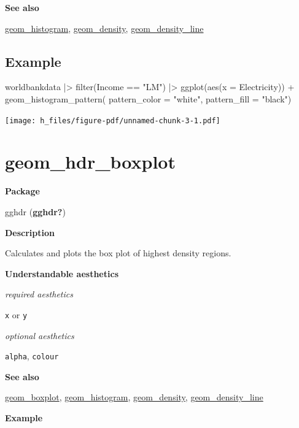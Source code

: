 \documentclass[
  letterpaper,
  DIV=11,
  numbers=noendperiod]{scrreprt}
\newenvironment{Shaded}{\begin{snugshade}}{\end{snugshade}}
\newcommand{\AttributeTok}[1]{\textcolor[rgb]{0.40,0.45,0.13}{#1}}
\newcommand{\FunctionTok}[1]{\textcolor[rgb]{0.28,0.35,0.67}{#1}}
\newcommand{\NormalTok}[1]{\textcolor[rgb]{0.00,0.23,0.31}{#1}}
\newcommand{\SpecialCharTok}[1]{\textcolor[rgb]{0.37,0.37,0.37}{#1}}
\newcommand{\StringTok}[1]{\textcolor[rgb]{0.13,0.47,0.30}{#1}}
\begin{document}
\textbf{See also}

\hyperref[histogram]{geom\_histogram},
\hyperref[density]{geom\_density},
\hyperref[density_line]{geom\_density\_line}

\subsection{Example}\label{example-7}

\begin{Shaded}
\begin{Highlighting}[]
\NormalTok{worldbankdata }\SpecialCharTok{|\textgreater{}}
  \FunctionTok{filter}\NormalTok{(Income }\SpecialCharTok{==} \StringTok{"LM"}\NormalTok{) }\SpecialCharTok{|\textgreater{}}
  \FunctionTok{ggplot}\NormalTok{(}\FunctionTok{aes}\NormalTok{(}\AttributeTok{x =}\NormalTok{ Electricity)) }\SpecialCharTok{+}   
  \FunctionTok{geom\_histogram\_pattern}\NormalTok{( }\AttributeTok{pattern\_color =} \StringTok{"white"}\NormalTok{,}
                   \AttributeTok{pattern\_fill =} \StringTok{"black"}\NormalTok{)}
\end{Highlighting}
\end{Shaded}

\texttt{[image: h\_files/figure-pdf/unnamed-chunk-3-1.pdf]}

\section{geom\_hdr\_boxplot}\label{geom_hdr_boxplot}

\textbf{Package}

gghdr (\textbf{gghdr?})

\textbf{Description}

Calculates and plots the box plot of highest density regions.

\textbf{Understandable aesthetics}

\emph{required aesthetics}

\texttt{x} or \texttt{y}

\emph{optional aesthetics}

\texttt{alpha}, \texttt{colour}

\textbf{See also}

\hyperref[boxplot]{geom\_boxplot},
\hyperref[histogram]{geom\_histogram},
\hyperref[density]{geom\_density},
\hyperref[density_line]{geom\_density\_line}

\textbf{Example}
\end{document}
